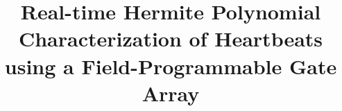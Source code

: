 \documentclass[conference]{IEEEtran}
\begin{document}
%
\title{Real-time Hermite Polynomial Characterization of Heartbeats using a Field-Programmable Gate Array}




% 

\end{document}
